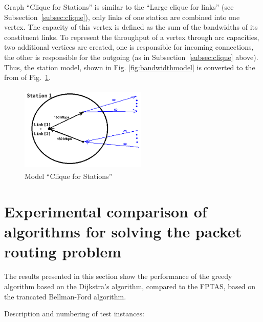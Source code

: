 \documentclass{ifacconf}
\begin{document}
Graph ``Clique  for Stations'' is similar to the ``Large clique for links''
(see Subsection~\ref{subsec:clique}), only links of one station are combined into one vertex. The capacity of this vertex is defined as
the sum of the bandwidths of its constituent links.
To represent the throughput of a vertex through
arc capacities, two additional vertices are created, one is responsible for incoming
connections, the other is responsible for the outgoing (as in Subsection~\ref{subsec:clique} above). 
Thus, the station model, shown in Fig. \ref{fig:bandwidthmodel}
is converted to the from of Fig.~\ref{fig:cliqforstn}.


\begin{figure}
\begin{center}
\includegraphics[width=6cm,height=4.1cm]{cliqforstn.png}
 \caption{\label{fig:cliqforstn} Model ``Clique for Stations''}
\end{center}
\end{figure}


\section{Experimental comparison of algorithms for solving the packet routing problem}
\label{subsec:exp}

The results presented in this section show the performance of the greedy algorithm based on the Dijkstra's algorithm, compared to the FPTAS, based on the trancated Bellman-Ford algorithm. 

Description and numbering of test instances:
\end{document}
